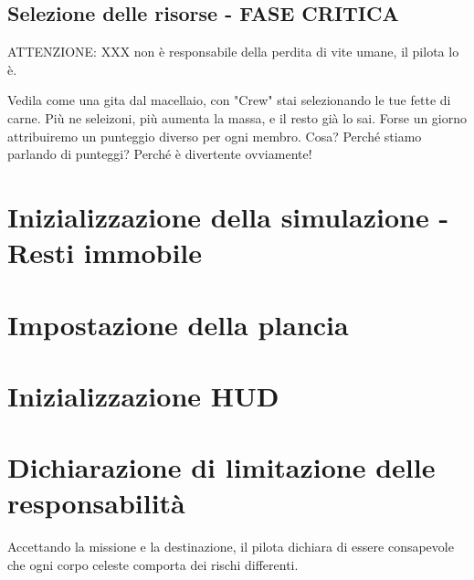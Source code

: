 \documentclass[9pt, twoside]{article}
\begin{document}
\subsection{Selezione delle risorse - FASE CRITICA}
\begin{tcolorbox}[breakable, width=\linewidth, fontupper=\small]
ATTENZIONE: XXX non è responsabile della perdita di vite umane, il pilota lo è.
\end{tcolorbox}
Vedila come una gita dal macellaio, con "Crew" stai selezionando le tue fette di carne.
Più ne seleizoni, più aumenta la massa, e il resto già lo sai.
Forse un giorno attribuiremo un punteggio diverso per ogni membro.
Cosa? Perché stiamo parlando di punteggi? 
Perché è divertente ovviamente!
\newpage

\section{Inizializzazione della simulazione - Resti immobile}
\newpage

\section{Impostazione della plancia}
\newpage

\section{Inizializzazione HUD}
\newpage

\section{Dichiarazione di limitazione delle respon\-sabi\-lità}
\begin{tcolorbox}[breakable, width=\linewidth, fontupper=\small]
Accettando la missione e la destinazione, il pilota dichiara di essere consapevole che ogni corpo celeste comporta dei rischi differenti.
\end{tcolorbox}
\end{document}
